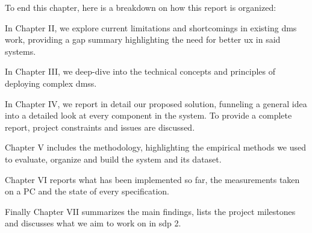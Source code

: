 To end this chapter, here is a breakdown on how this report is organized:

In Chapter II, we explore current limitations and shortcomings in existing \gls{dms} work, providing a gap summary highlighting the need for better \gls{ux} in said systems.

In Chapter III, we deep-dive into the technical concepts and principles of deploying complex \glspl{dms}.

In Chapter IV, we report in detail our proposed solution, funneling a general idea into a detailed look at every component in the system. To provide a complete report, project constraints and issues are discussed.

Chapter V includes the methodology, highlighting the empirical methods we used to evaluate, organize and build the system and its dataset.

Chapter VI reports what has been implemented so far, the measurements taken on a PC and the state of every specification.

Finally Chapter VII summarizes the main findings, lists the project milestones and discusses what we aim to work on in \gls{sdp} 2.